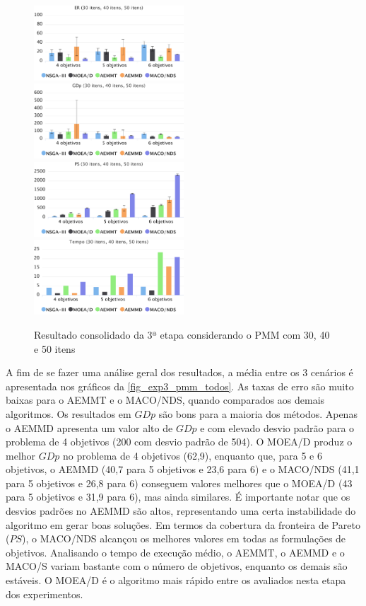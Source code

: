 \begin{figure}[!htbp]
	\includegraphics[width=0.5\textwidth]{cap_experimentos/figs/etapa3/er-mkp-todos}
	\includegraphics[width=0.5\textwidth]{cap_experimentos/figs/etapa3/gd-mkp-todos}
	\includegraphics[width=0.5\textwidth]{cap_experimentos/figs/etapa3/ps-mkp-todos}
	\includegraphics[width=0.5\textwidth]{cap_experimentos/figs/etapa3/time-mkp-todos}
	\caption{\label{fig_exp3_pmm_todos}Resultado consolidado da 3ª etapa considerando o PMM com 30, 40 e 50 itens}
\end{figure}

A fim de se fazer uma análise geral dos resultados, a média entre os 3 cenários é apresentada nos gráficos da \autoref{fig_exp3_pmm_todos}. As taxas de erro são muito baixas para o AEMMT e o MACO/NDS, quando comparados aos demais algoritmos. Os resultados em $GDp$ são bons para a maioria dos métodos. Apenas o AEMMD apresenta um valor alto de $GDp$ e com elevado desvio padrão para o problema de 4 objetivos (200 com desvio padrão de 504). O MOEA/D produz o melhor $GDp$ no problema de 4 objetivos (62,9), enquanto que, para 5 e 6 objetivos, o AEMMD (40,7 para 5 objetivos e 23,6 para 6) e o MACO/NDS (41,1 para 5 objetivos e 26,8 para 6) conseguem valores melhores que o MOEA/D (43 para 5 objetivos e 31,9 para 6), mas ainda similares. É importante notar que os desvios padrões no AEMMD são altos, representando uma certa instabilidade do algoritmo em gerar boas soluções. Em termos da cobertura da fronteira de Pareto ($PS$), o MACO/NDS alcançou os melhores valores em todas as formulações de objetivos. Analisando o tempo de execução médio, o AEMMT, o AEMMD e o MACO/S variam bastante com o número de objetivos, enquanto os demais são estáveis. O MOEA/D é o algoritmo mais rápido entre os avaliados nesta etapa dos experimentos.

